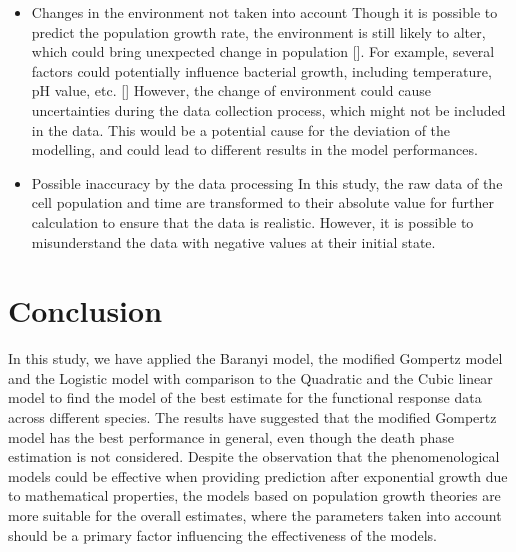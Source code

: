 \documentclass[11pt, oneside]{article}
\begin{document}
	\begin{itemize}
	\item Changes in the environment not taken into account
	\bigbreak
	\noindent Though it is possible to predict the population growth rate, the environment is still likely to alter, which could bring unexpected change in population [\cite{sutherland2002behavioural}]. For example, several factors could potentially influence bacterial growth, including temperature, pH value, etc. [\cite{gale1943factors}] However, the change of environment could cause uncertainties during the data collection process, which might not be included in the data. This would be a potential cause for the deviation of the modelling, and could lead to different results in the model performances.
	\item Possible inaccuracy by the data processing
	\bigbreak 
	\noindent In this study, the raw data of the cell population and time are transformed to their absolute value for further calculation to ensure that the data is realistic. However, it is possible to misunderstand the data with negative values at their initial state.
	\end{itemize}
	\pagebreak
	\section{Conclusion}
	
	In this study, we have applied the Baranyi model, the modified Gompertz model and the Logistic model with comparison to the Quadratic and the Cubic linear model to find the model of the best estimate for the functional response data across different species. The results have suggested that the modified Gompertz model has the best performance in general, even though the death phase estimation is not considered. Despite the observation that the phenomenological models could be effective when providing prediction after exponential growth due to mathematical properties, the models based on population growth theories are more suitable for the overall estimates, where the parameters taken into account should be a primary factor influencing the effectiveness of the models.
	\pagebreak



\end{document}
